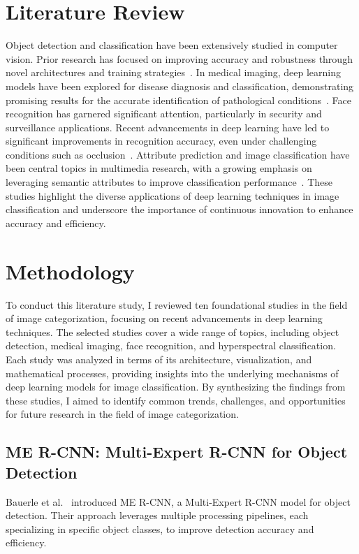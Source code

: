 \documentclass[journal, biblatex]{IEEEtran}
\begin{document}
\section{Literature Review}
Object detection and classification have been extensively studied in computer vision. Prior research has focused on improving accuracy and robustness through novel architectures and training strategies~\cite{lee2020, tan2020, kumar2020, abdulnabi2015, zhang2021, wu2018, bauerle2021, cozzolino2020, krishnendu2020, tang2019, hara2018, wang2023}. In medical imaging, deep learning models have been explored for disease diagnosis and classification, demonstrating promising results for the accurate identification of pathological conditions~\cite{abdulnabi2015, tan2020, krishnendu2020}. Face recognition has garnered significant attention, particularly in security and surveillance applications. Recent advancements in deep learning have led to significant improvements in recognition accuracy, even under challenging conditions such as occlusion~\cite{kumar2020, wu2018}. Attribute prediction and image classification have been central topics in multimedia research, with a growing emphasis on leveraging semantic attributes to improve classification performance~\cite{abdulnabi2015}. These studies highlight the diverse applications of deep learning techniques in image classification and underscore the importance of continuous innovation to enhance accuracy and efficiency.

\section{Methodology}
To conduct this literature study, I reviewed ten foundational studies in the field of image categorization, focusing on recent advancements in deep learning techniques. The selected studies cover a wide range of topics, including object detection, medical imaging, face recognition, and hyperspectral classification. Each study was analyzed in terms of its architecture, visualization, and mathematical processes, providing insights into the underlying mechanisms of deep learning models for image classification. By synthesizing the findings from these studies, I aimed to identify common trends, challenges, and opportunities for future research in the field of image categorization.

\subsection{ME R-CNN: Multi-Expert R-CNN for Object Detection}
Bauerle et al.~\cite{bauerle2021} introduced ME R-CNN, a Multi-Expert R-CNN model for object detection. Their approach leverages multiple processing pipelines, each specializing in specific object classes, to improve detection accuracy and efficiency.
\end{document}
